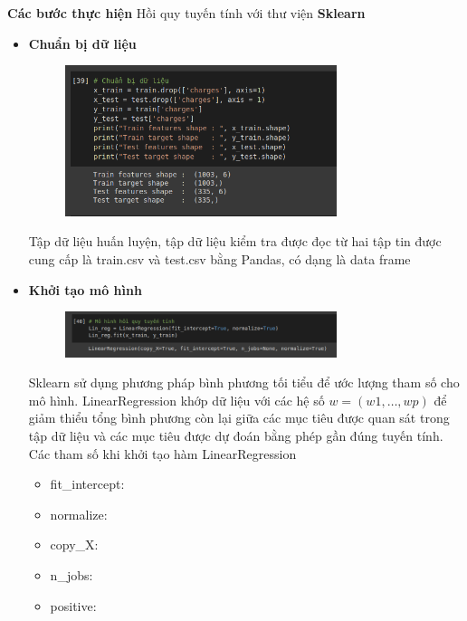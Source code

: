 \documentclass{article}
\begin{document}
	\textbf{Các bước thực hiện} Hồi quy tuyến tính với thư viện \textbf{Sklearn}
	\begin{itemize}
		\item \textbf{Chuẩn bị dữ liệu}
		\begin{figure}[H]
			\centering
			\includegraphics[width=0.75\textwidth]{images/linear_reg/linear_reg_data_preparation.png}
		\end{figure}
		Tập dữ liệu huấn luyện, tập dữ liệu kiểm tra được đọc từ hai tập tin được cung cấp là train.csv và test.csv bằng Pandas, có dạng là data frame
		
		\item \textbf{Khởi tạo mô hình}
		\begin{figure}[H]
			\centering
			\includegraphics[width=0.75\textwidth]{images/linear_reg/linear_reg_init.png}
		\end{figure}
		Sklearn sử dụng phương pháp bình phương tối tiểu để ước lượng tham số cho mô hình. LinearRegression khớp dữ liệu với các hệ số $w = (w1,…, wp)$ để giảm thiểu tổng bình phương còn lại giữa các mục tiêu được quan sát trong tập dữ liệu và các mục tiêu được dự đoán bằng phép gần đúng tuyến tính.
		Các tham số khi khởi tạo hàm LinearRegression
		\begin{itemize}
			\item fit\_intercept: 
			\item normalize:
			\item copy\_X:
			\item n\_jobs: 
			\item positive:
		\end{itemize}
		

\end{itemize}
\end{document}
